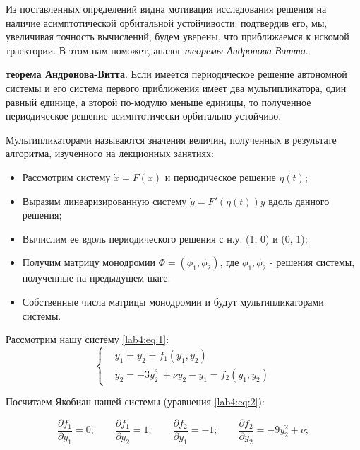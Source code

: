 Из поставленных определений видна мотивация исследования решения на наличие
асимптотической орбитальной устойчивости: подтвердив его, мы, увеличивая
точность вычислений, будем уверены, что приближаемся к искомой
траектории. В этом нам поможет, аналог \textit{теоремы Андронова-Витта}.

\begin{theorem}
    \textbf{теорема Андронова-Витта}. Если имеется
    периодическое решение автономной системы и его система первого приближения
    имеет два мультипликатора, один равный единице, а второй по-модулю меньше
    единицы, то полученное периодическое решение асимптотически орбитально устойчиво.
\end{theorem}

Мультипликаторами называются значения величин, полученных в результате
алгоритма, изученного на лекционных занятиях:

\begin{itemize}
    \item Рассмотрим систему $\dot{x} = F(x)$ и периодическое решение $\eta(t)$;
    \item Выразим линеаризированную систему $\dot{y} = F'(\eta(t))y$ вдоль данного решения;
    \item Вычислим ее вдоль периодического решения с н.у. (1, 0) и (0, 1);
    \item Получим матрицу монодромии $\Phi = (\phi_1, \phi_2)$, где $\phi_1, \phi_2$ -
    решения системы, полученные на предыдущем шаге.
    \item Собственные числа матрицы монодромии и будут мультипликаторами системы.
\end{itemize}

Рассмотрим нашу систему \eqref{lab4:eq:1}:
\begin{equation}\label{lab4:eq:1}
    \begin{cases}
        &\dot{y_1} = y_2 = f_1(y_1, y_2) \\
        &\dot{y_2} = -3y_2^3\ + \nu y_2 - y_1 = f_2(y_1, y_2)
    \end{cases}
\end{equation}

Посчитаем Якобиан нашей системы (уравнения \eqref{lab4:eq:2}):

\begin{equation}\label{lab4:eq:2}
    \frac{\partial f_1}{\partial y_1} = 0;\qquad
    \frac{\partial f_1}{\partial y_2} = 1;\qquad
    \frac{\partial f_2}{\partial y_1} = -1;\qquad
    \frac{\partial f_2}{\partial y_2} = -9y_2^2 + \nu;
\end{equation}

